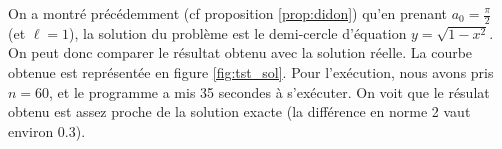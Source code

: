 \documentclass[10pt,a4paper]{article}
\theoremstyle{plain}
\theoremstyle{definition}
\begin{document}
\vspace*{\baselineskip}

On a montré précédemment (cf proposition \ref{prop:didon}) qu'en prenant $a_0=\frac{\pi}{2}$ (et $\ell=1$), la solution du problème est le demi-cercle d'équation $y=\sqrt{1-x^2}$. On peut donc comparer le résultat obtenu avec la solution réelle. La courbe obtenue est représentée en figure \ref{fig:tst_sol}. Pour l'exécution, nous avons pris $n=60$, et le programme a mis 35 secondes à s'exécuter. On voit que le résulat obtenu est assez proche de la solution exacte (la différence en norme 2 vaut environ 0.3).

\begin{figure}
	\centering
\end{figure}
\end{document}
